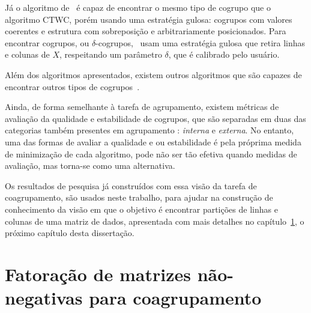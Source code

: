 \documentclass[
    12pt,                %
    oneside,            %
    a4paper,            %
    english,            %
    brazil                %
    ]{abntex2ppgsi}
\begin{document}
Já o algoritmo de~ é capaz de encontrar o mesmo tipo de cogrupo que o algoritmo CTWC, porém usando uma estratégia gulosa: cogrupos com valores coerentes e estrutura com sobreposição e arbitrariamente posicionados.
Para encontrar cogrupos, ou $\delta$-cogrupos,~ usam uma estratégia gulosa que retira linhas e colunas de $X$, respeitando um parâmetro $\delta$, que é calibrado pelo usuário.

Além dos algoritmos apresentados, existem outros algoritmos que são capazes de encontrar outros tipos de cogrupos~\cite{Franca20102,Yang2013,Hochreiter2010,Cabanes2012}.

Ainda, de forma semelhante à tarefa de agrupamento, existem métricas de avaliação da qualidade e estabilidade de cogrupos, que são separadas em duas das categorias também presentes em agrupamento \cite{Hochreiter2010}: \textit{interna} e \textit{externa}.
No entanto, uma das formas de avaliar a qualidade e ou estabilidade é pela próprima medida de minimização de cada algoritmo, pode não ser tão efetiva quando medidas de avaliação, mas torna-se como uma alternativa.

Os resultados de pesquisa já construídos com essa visão da tarefa de coagrupamento, são usados neste trabalho, para ajudar na construção de conhecimento da visão em que o objetivo é encontrar partições de linhas e colunas de uma matriz de dados, apresentada com mais detalhes no capítulo~\ref{ch:fatoracao}, o próximo capítulo desta dissertação.

\chapter{Fatoração de matrizes não-negativas para coagrupamento}
\label{ch:fatoracao}
\end{document}
